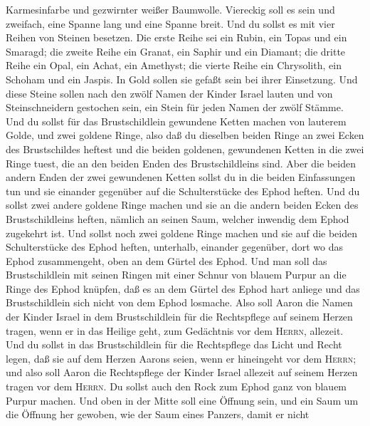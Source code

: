 Karmesinfarbe und gezwirnter weißer Baumwolle.  Viereckig
soll es sein und zweifach, eine Spanne lang und eine Spanne breit.
 Und du sollst es mit vier Reihen von Steinen besetzen.
Die erste Reihe sei ein Rubin, ein Topas und ein Smaragd;
 die zweite Reihe ein Granat, ein Saphir und ein Diamant;
 die dritte Reihe ein Opal, ein Achat, ein Amethyst;
 die vierte Reihe ein Chrysolith, ein Schoham und ein
Jaspis. In Gold sollen sie gefaßt sein bei ihrer Einsetzung.
 Und diese Steine sollen nach den zwölf Namen der Kinder
Israel lauten und von Steinschneidern gestochen sein, ein Stein für
jeden Namen der zwölf Stämme.  Und du sollst für das
Brustschildlein gewundene Ketten machen von lauterem Golde,
 und zwei goldene Ringe, also daß du dieselben beiden
Ringe an zwei Ecken des Brustschildes heftest  und die
beiden goldenen, gewundenen Ketten in die zwei Ringe tuest, die an den
beiden Enden des Brustschildleins sind.  Aber die beiden
andern Enden der zwei gewundenen Ketten sollst du in die beiden
Einfassungen tun und sie einander gegenüber auf die Schulterstücke des
Ephod heften.  Und du sollst zwei andere goldene Ringe
machen und sie an die andern beiden Ecken des Brustschildleins heften,
nämlich an seinen Saum, welcher inwendig dem Ephod zugekehrt ist.
 Und sollst noch zwei goldene Ringe machen und sie auf
die beiden Schulterstücke des Ephod heften, unterhalb, einander
gegenüber, dort wo das Ephod zusammengeht, oben an dem Gürtel des Ephod.
 Und man soll das Brustschildlein mit seinen Ringen mit
einer Schnur von blauem Purpur an die Ringe des Ephod knüpfen, daß es an
dem Gürtel des Ephod hart anliege und das Brustschildlein sich nicht von
dem Ephod losmache.  Also soll Aaron die Namen der Kinder
Israel in dem Brustschildlein für die Rechtspflege auf seinem Herzen
tragen, wenn er in das Heilige geht, zum Gedächtnis vor dem
\textsc{Herrn}, allezeit.  Und du sollst in das
Brustschildlein für die Rechtspflege das Licht und Recht legen, daß sie
auf dem Herzen Aarons seien, wenn er hineingeht vor dem \textsc{Herrn};
und also soll Aaron die Rechtspflege der Kinder Israel allezeit auf
seinem Herzen tragen vor dem \textsc{Herrn}.  Du sollst
auch den Rock zum Ephod ganz von blauem Purpur machen. 
Und oben in der Mitte soll eine Öffnung sein, und ein Saum um die
Öffnung her gewoben, wie der Saum eines Panzers, damit er nicht
